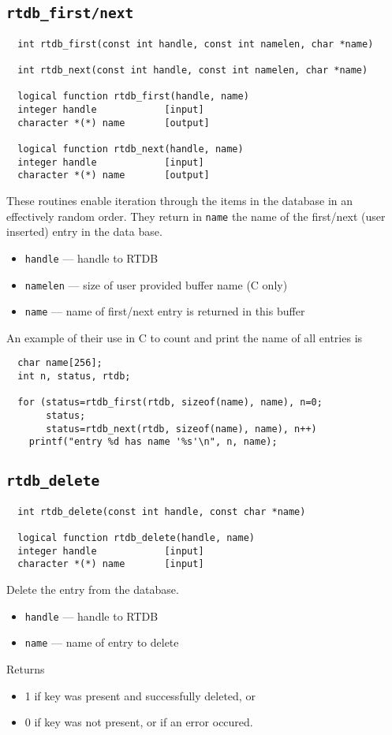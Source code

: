 \subsection{{\tt rtdb\_first/next}}
\begin{verbatim}
  int rtdb_first(const int handle, const int namelen, char *name)

  int rtdb_next(const int handle, const int namelen, char *name)

  logical function rtdb_first(handle, name)
  integer handle            [input]
  character *(*) name       [output]

  logical function rtdb_next(handle, name)
  integer handle            [input]
  character *(*) name       [output]
\end{verbatim}
These routines enable iteration through the items in the database in
an effectively random order.  They return in {\tt name} the name of
the first/next (user inserted) entry in the data base. 
\begin{itemize}
\item {\tt handle} --- handle to RTDB
\item {\tt namelen} ---  size of user provided buffer name (C only)
\item {\tt name} --- name of first/next entry is returned in this
  buffer
\end{itemize}

An example of their use in C to count and print the name of all
entries is
\begin{verbatim}
  char name[256];
  int n, status, rtdb;

  for (status=rtdb_first(rtdb, sizeof(name), name), n=0;
       status;
       status=rtdb_next(rtdb, sizeof(name), name), n++) 
    printf("entry %d has name '%s'\n", n, name);
\end{verbatim}

\subsection{{\tt rtdb\_delete}}
\begin{verbatim}
  int rtdb_delete(const int handle, const char *name)

  logical function rtdb_delete(handle, name)
  integer handle            [input]
  character *(*) name       [input]
\end{verbatim}
Delete the entry from the database. 
\begin{itemize}
\item {\tt handle} --- handle to RTDB
\item {\tt name} --- name of entry to delete
\end{itemize}
Returns
\begin{itemize}
\item 1 if key was present and successfully deleted, or
\item 0 if key was not present, or if an error occured.
\end{itemize}

